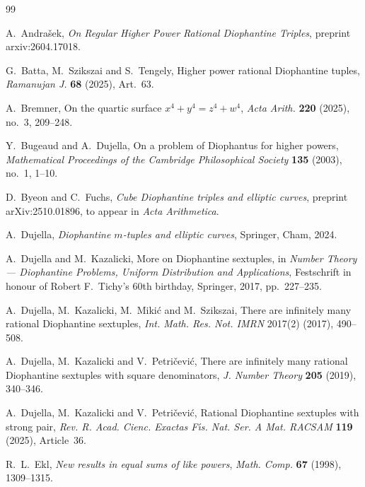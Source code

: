 \documentclass[11pt]{article}
\begin{document}
\begin{thebibliography}{99}


A.~Andra\v{s}ek,
\newblock \emph{On Regular Higher Power Rational Diophantine Triples},
\newblock preprint arxiv:2604.17018.


G.~Batta, M.~Szikszai and S.~Tengely,
\newblock Higher power rational Diophantine tuples,
\newblock \emph{Ramanujan J.} \textbf{68} (2025), Art.~63.


A.~Bremner,
\newblock On the quartic surface $x^4+y^4=z^4+w^4$,
\newblock \emph{Acta Arith.} \textbf{220} (2025), no.~3, 209--248.

Y.~Bugeaud and A.~Dujella,
On a problem of Diophantus for higher powers,
\emph{Mathematical Proceedings of the Cambridge Philosophical Society}
\textbf{135} (2003), no.~1, 1--10.

D.~Byeon and C.~Fuchs,
\newblock \emph{Cube Diophantine triples and elliptic curves},
\newblock preprint arXiv:2510.01896, to appear in \emph{Acta Arithmetica}.



A.~Dujella,
\newblock \emph{Diophantine $m$-tuples and elliptic curves},
\newblock Springer, Cham, 2024.

A.~Dujella and M.~Kazalicki,
\newblock More on Diophantine sextuples,
\newblock in \emph{Number Theory --- Diophantine Problems, Uniform Distribution and Applications},
Festschrift in honour of Robert F.~Tichy's 60th birthday,
Springer, 2017, pp.~227--235.

A.~Dujella, M.~Kazalicki, M.~Miki\'c and M.~Szikszai,
\newblock There are infinitely many rational Diophantine sextuples,
\newblock \emph{Int. Math. Res. Not. IMRN} 2017(2) (2017), 490--508.

A.~Dujella, M.~Kazalicki and V.~Petri\v{c}evi\'c,
\newblock There are infinitely many rational Diophantine sextuples with square denominators,
\newblock \emph{J. Number Theory} \textbf{205} (2019), 340--346.

A.~Dujella, M.~Kazalicki and V.~Petri\v{c}evi\'c,
\newblock Rational Diophantine sextuples with strong pair,
\newblock \emph{Rev. R. Acad. Cienc. Exactas F\'{\i}s. Nat. Ser. A Mat. RACSAM} \textbf{119} (2025), Article~36.

R.~L.~Ekl,
\newblock \emph{New results in equal sums of like powers},
\newblock \emph{Math. Comp.} \textbf{67} (1998), 1309--1315.


\end{thebibliography}
\end{document}
